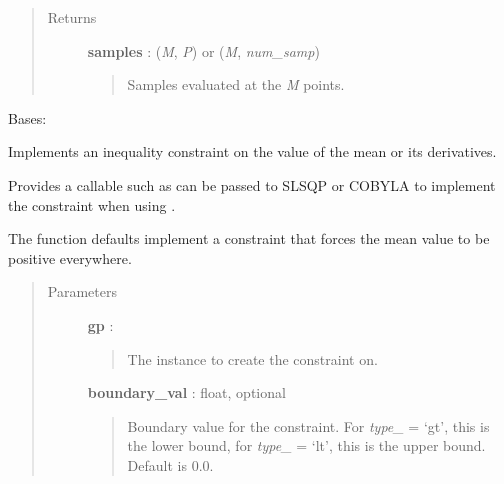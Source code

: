 \documentclass[letterpaper,10pt,english]{sphinxmanual}
\begin{document}
\begin{fulllineitems}
\begin{fulllineitems}
\begin{quote}
\begin{description}
\item[{Returns }] \leavevmode
\textbf{samples} :  (\emph{M}, \emph{P}) or (\emph{M}, \emph{num\_samp})
\begin{quote}

Samples evaluated at the \emph{M} points.
\end{quote}

\end{description}\end{quote}

\end{fulllineitems}


\end{fulllineitems}


\begin{fulllineitems}
\label{gptools:gptools.gaussian_process.Constraint}
Bases: 

Implements an inequality constraint on the value of the mean or its derivatives.

Provides a callable such as can be passed to SLSQP or COBYLA to implement
the constraint when using .

The function defaults implement a constraint that forces the mean value to
be positive everywhere.
\begin{quote}\begin{description}
\item[{Parameters }] \leavevmode
\textbf{gp} : {\hyperref[gptools:gptools.gaussian_process.GaussianProcess]{}}
\begin{quote}

The {\hyperref[gptools:gptools.gaussian_process.GaussianProcess]{}} instance to create the constraint on.
\end{quote}

\textbf{boundary\_val} : float, optional
\begin{quote}

Boundary value for the constraint. For \emph{type\_} = `gt', this is the lower
bound, for \emph{type\_} = `lt', this is the upper bound. Default is 0.0.
\end{quote}


\end{description}
\end{quote}
\end{fulllineitems}
\end{document}
